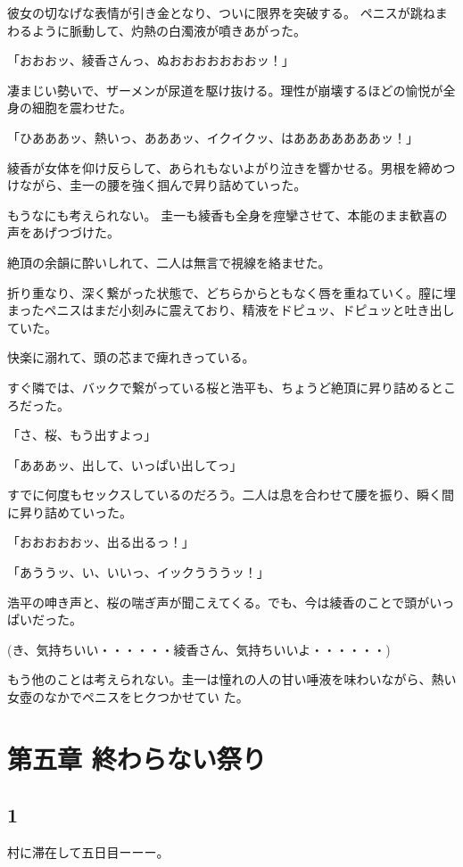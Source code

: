 ﻿\documentclass[book,tate]{jlreq}
\begin{document}
彼女の切なげな表情が引き金となり、ついに限界を突破する。 ペニスが跳ねまわるように脈動して、灼熱の白濁液が噴きあがった。

「おおおッ、綾香さんっ、ぬおおおおおおおッ！」

凄まじい勢いで、ザーメンが尿道を駆け抜ける。理性が崩壊するほどの愉悦が全身の細胞を震わせた。

「ひあああッ、熱いっ、あああッ、イクイクッ、はあああああああッ！」

綾香が女体を仰け反らして、あられもないよがり泣きを響かせる。男根を締めつけながら、圭一の腰を強く掴んで昇り詰めていった。

もうなにも考えられない。 圭一も綾香も全身を痙攣させて、本能のまま歓喜の声をあげつづけた。

絶頂の余韻に酔いしれて、二人は無言で視線を絡ませた。

折り重なり、深く繋がった状態で、どちらからともなく唇を重ねていく。膣に埋まったペニスはまだ小刻みに震えており、精液をドピュッ、ドピュッと吐き出していた。

快楽に溺れて、頭の芯まで痺れきっている。

すぐ隣では、バックで繋がっている桜と浩平も、ちょうど絶頂に昇り詰めるところだった。

「さ、桜、もう出すよっ」

「あああッ、出して、いっぱい出してっ」

すでに何度もセックスしているのだろう。二人は息を合わせて腰を振り、瞬く間に昇り詰めていった。

「おおおおおッ、出る出るっ！」

「あううッ、い、いいっ、イックうううッ！」

浩平の呻き声と、桜の喘ぎ声が聞こえてくる。でも、今は綾香のことで頭がいっぱいだった。

(き、気持ちいい・・・・・・綾香さん、気持ちいいよ・・・・・・)

もう他のことは考えられない。圭一は憧れの人の甘い唾液を味わいながら、熱い女壺のなかでペニスをヒクつかせてい た。

\chapter{第五章 終わらない祭り}

\section*{1}

村に滞在して五日目ーーー。
\end{document}
